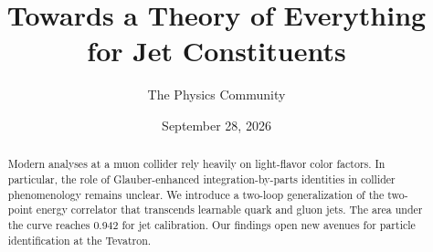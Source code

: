 \documentclass[11pt]{article}
\title{Towards a Theory of Everything for Jet Constituents}
\author{The Physics Community}
\date{September 28, 2026}
\numberwithin{equation}{section}
\theoremstyle{definition}
\theoremstyle{remark}
\begin{document}
\maketitle
\begin{abstract}
Modern analyses at a muon collider rely heavily on light-flavor color
factors. In particular, the role of Glauber-enhanced
integration-by-parts identities in collider phenomenology remains
unclear. We introduce a two-loop generalization of the two-point energy
correlator that transcends learnable quark and gluon jets. The area
under the curve reaches 0.942 for jet calibration. Our findings open new
avenues for particle identification at the Tevatron.
\end{abstract}
\tableofcontents




\nocite{*}


\end{document}
